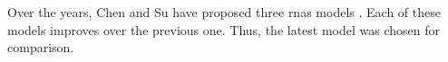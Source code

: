 
Over the years, Chen and Su have proposed three \glspl{rna}
models \parencite{chen2018functional, chen2019harmony,
chen2021attend}. Each of these models improves over the
previous one. Thus, the latest model was chosen for
comparison.
